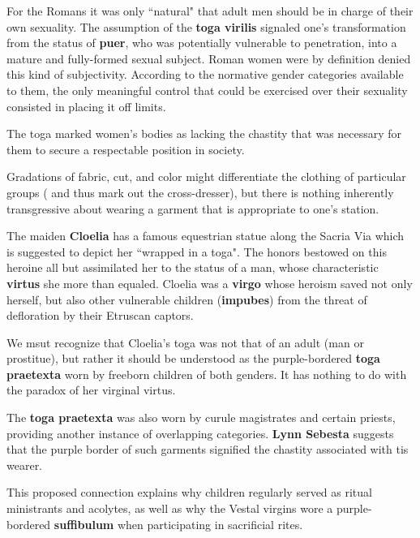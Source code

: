 For the Romans it was only ``natural" that adult men should be in charge of their own sexuality. The assumption of the \textbf{toga virilis} signaled one's transformation from the status of \textbf{puer}, who was potentially vulnerable to penetration, into a mature and fully-formed sexual subject. Roman women were by definition denied this kind of subjectivity. According to the normative gender categories available to them, the only meaningful control that could be exercised over their sexuality consisted in placing it off limits. 

\begin{nte}
    The toga marked women's bodies as lacking the chastity that was necessary for them to secure a respectable position in society.
\end{nte}


Gradations of fabric, cut, and color might differentiate the clothing of particular groups ( and thus mark out the cross-dresser), but there is nothing inherently transgressive about wearing a garment that is appropriate to one's station. 

The maiden \textbf{Cloelia} has a famous equestrian statue along the Sacria Via which is suggested to depict her ``wrapped in a toga". The honors bestowed on this heroine all but assimilated her to the status of a man, whose characteristic \textbf{virtus} she more than equaled. Cloelia was a \textbf{virgo} whose heroism saved not only herself, but also other vulnerable children (\textbf{impubes}) from the threat of defloration by their Etruscan captors. 

\begin{rmk}
    We msut recognize that Cloelia's toga was not that of an adult (man or prostitue), but rather it should be understood as the purple-bordered \textbf{toga praetexta} worn by freeborn children of both genders. It has nothing to do with the paradox of her virginal virtus.
\end{rmk}

The \textbf{toga praetexta} was also worn by curule magistrates and certain priests, providing another instance of overlapping categories. \textbf{Lynn Sebesta} suggests that the purple border of such garments signified the chastity associated with tis wearer.

This proposed connection explains why children regularly served as ritual ministrants and acolytes, as well as why the Vestal virgins wore a purple-bordered \textbf{suffibulum} when participating in sacrificial rites.

